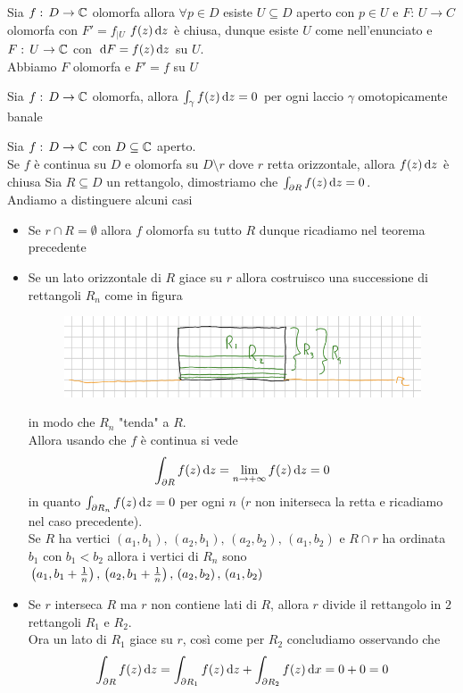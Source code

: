 \begin{cor}Sia $f:\, D\to \mathbb{C}$ olomorfa allora $\forall p\in D$ esiste $U\subseteq D$ aperto con $p\in U $ e $F:\, U \to C$ olomorfa con $F'=f_{\vert U} $
\proof $f(z) \, \mathrm{d} z $ \`e chiusa, dunque esiste $U$ come nell'enunciato e $F:\, U \to \mathbb{C}$ con $\, \mathrm{d} F=f(z) \, \mathrm{d} z $ su $U$.\\
Abbiamo $F$ olomorfa e $F'=f$ su $U$ 
\endproof
\end{cor}
\begin{cor}Sia $f:\, D \to \mathbb{C}$ olomorfa, allora $\int_\gamma f(z) \, \mathrm{d} z =0$ per ogni laccio $\gamma$ omotopicamente banale
\end{cor}
\spazio
\begin{prop}Sia $f:\, D \to \mathbb{C}$ con $D\subseteq  \mathbb{C}$ aperto.\\
Se $f$ \`e continua su $D$ e olomorfa su $D\setminus r $ dove $r$ retta orizzontale, allora $f(z) \, \mathrm{d} z $ \`e chiusa
\proof Sia $R\subseteq D$ un rettangolo, dimostriamo che $\int_{\partial R} f(z)\, \mathrm{d} z=0$.\\
Andiamo a distinguere alcuni  casi 
\begin{itemize}
\item Se $r\cap R=\emptyset$ allora $f$ olomorfa su tutto $R$ dunque ricadiamo nel teorema precedente
\item Se un lato orizzontale di $R$ giace su $r$ allora costruisco una successione di rettangoli $R_n$ come in figura 
\begin{figure}[!h]
\centering 
\includegraphics{Figure/04_01}
\end{figure}
in modo che $R_n$ "tenda" a $R$.\\
Allora usando che $f$ \`e continua si vede
$$ \int_{\partial R} f(z) \, \mathrm{d} z = \lim_{n\to +\infty} f(z) \, \mathrm{d} z  =0$$ 
in quanto $\int_{\partial R_n} f(z) \, \mathrm{d} z =0$ per ogni $n$ ($r$ non initerseca la retta e ricadiamo nel caso precedente).\\
Se $R$ ha vertici $(a_1, b_1), \, (a_2,b_1), \, (a_2,b_2), \, (a_1,b_2)$ e $R\cap r$ ha ordinata $b_1$ con $b_1<b_2$ allora i vertici di $R_n$ sono $\left( a_1, b_1+\frac{1}{n} \right),\, \left( a_2, b_1+\frac{1}{n} \right),\, \left( a_2,b_2 \right) , \,  (a_1,b_2)$
\item Se $r$ interseca $R$ ma $r$ non contiene lati di $R$, allora $r$ divide il rettangolo in $2$ rettangoli $R_1$ e $R_2$.\\
Ora un lato di $R_1$ giace su $r$, cos\`i come per $R_2$ concludiamo osservando che 
$$ \int_{\partial R} f(z) \, \mathrm{d} z = \int_{\partial R_1} f(z) \, \mathrm{d} z + \int_{\partial R_2} f(z)\, \mathrm{d} x = 0+0 = 0 $$
\end{itemize}
\end{prop}
